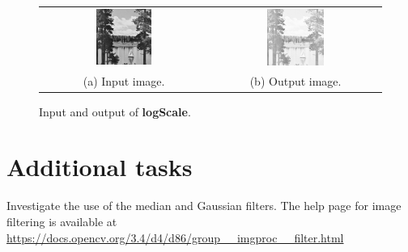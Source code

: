 \documentclass[english,a4paper,12pt,oneside]{article}
\begin{document}
        \begin {figure}[htb]
	\centering
	\begin{tabular}{cc}
		\includegraphics[width=0.35\textwidth]{lake}&
		\includegraphics[width=0.35\textwidth]{lake_log}\\
		(a) Input image. & (b) Output image.
	\end{tabular}
      \caption{\label{fig:logFilter}Input and output of \textbf{logScale}.}
    \end {figure}

    
\section{Additional tasks}

Investigate the use of the median and Gaussian filters. 
The help page for image filtering is available at \url{https://docs.opencv.org/3.4/d4/d86/group__imgproc__filter.html}
\end{document}
